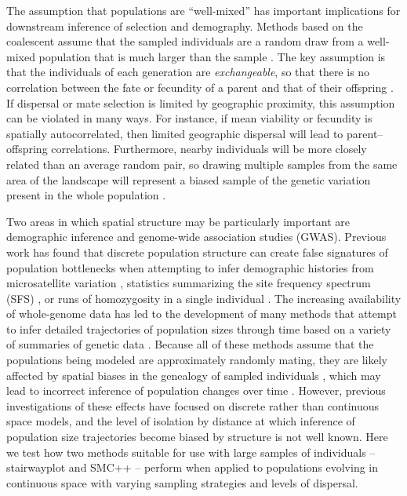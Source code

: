 \documentclass[10pt,twoside,lineno,hidelinks]{preprint}
\begin{document}
The assumption that populations are ``well-mixed'' has important implications for downstream inference of selection and demography. Methods based on the coalescent \citep{Kingman1982,wakeley2005coalescent} assume that the sampled individuals are a random draw from a well-mixed population
that is much larger than the sample \citep{wakeley2003gene}. The key assumption is that the individuals of each generation are \emph{exchangeable}, so that there is no correlation between the fate or fecundity of a parent and that of their offspring \citep{Huillet2011}. If dispersal or mate selection is limited by geographic proximity, this assumption can be violated in many ways. For instance, if mean viability or fecundity is spatially autocorrelated, then limited geographic dispersal will lead to parent--offspring correlations. Furthermore, nearby individuals will be more closely related than an average random pair, so drawing multiple samples from the same area of the landscape will represent a biased sample of the genetic variation present in the whole population \citep{Stadler2009}.%

Two areas in which spatial structure may be particularly important are demographic inference and genome-wide association studies (GWAS). Previous work has found that discrete population structure can create false signatures of population bottlenecks when attempting to infer demographic histories from microsatellite variation \citep{Chikhi2010}, statistics summarizing the site frequency spectrum (SFS) \citep{Ptak2002,Stadler2009,Onge2012}, or runs of homozygosity in a single individual \citep{Mazet2015}. The increasing availability of whole-genome data has led to the development of many methods that attempt to infer detailed trajectories of population sizes through time based on a variety of summaries of genetic data \citep{Liu2015,Schiffels2014,Sheehan2013,Terhorst2016}. 
Because all of these methods assume that the populations being modeled are approximately randomly mating, they are likely affected by spatial biases in the genealogy of sampled individuals \citep{Wakeley1999}, which may lead to incorrect inference of population changes over time \citep{Mazet2015}. However, previous investigations of these effects have focused on discrete rather than continuous space models, and the level of isolation by distance at which inference of population size trajectories become biased by structure is not well known. Here we test how two methods suitable for use with large samples of individuals -- stairwayplot \citep{Liu2015} and SMC++ \citep{Terhorst2016} -- perform when applied to populations evolving in continuous space with varying sampling strategies and levels of dispersal.  
\end{document}
